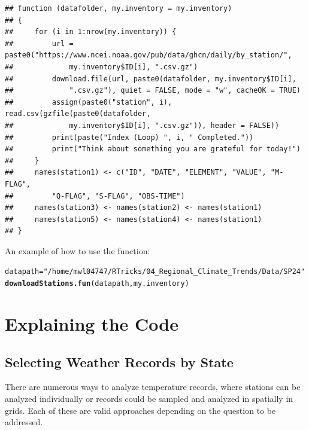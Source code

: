 \documentclass{article}\usepackage[]{graphicx}\usepackage[]{xcolor}
\makeatletter
\newcommand{\hlstr}[1]{\textcolor[rgb]{0.192,0.494,0.8}{#1}}%
\newcommand{\hlstd}[1]{\textcolor[rgb]{0.345,0.345,0.345}{#1}}%
\newcommand{\hlkwb}[1]{\textcolor[rgb]{0.69,0.353,0.396}{#1}}%
\newcommand{\hlkwd}[1]{\textcolor[rgb]{0.737,0.353,0.396}{\textbf{#1}}}%
\newenvironment{kframe}{%
 \def\at@end@of@kframe{}%
 \ifinner\ifhmode%
  \def\at@end@of@kframe{\end{minipage}}%
  \begin{minipage}{\columnwidth}%
 \fi\fi%
 \def\FrameCommand##1{\hskip\@totalleftmargin \hskip-\fboxsep
 \colorbox{shadecolor}{##1}\hskip-\fboxsep
     \hskip-\linewidth \hskip-\@totalleftmargin \hskip\columnwidth}%
 \MakeFramed {\advance\hsize-\width
   \@totalleftmargin\z@ \linewidth\hsize
   \@setminipage}}%
 {\par\unskip\endMakeFramed%
 \at@end@of@kframe}
\newenvironment{knitrout}{}{} %
\makeatother
\begin{document}
\begin{description}
\begin{knitrout}
\color{fgcolor}\begin{kframe}
\begin{verbatim}
## function (datafolder, my.inventory = my.inventory) 
## {
##     for (i in 1:nrow(my.inventory)) {
##         url = paste0("https://www.ncei.noaa.gov/pub/data/ghcn/daily/by_station/", 
##             my.inventory$ID[i], ".csv.gz")
##         download.file(url, paste0(datafolder, my.inventory$ID[i], 
##             ".csv.gz"), quiet = FALSE, mode = "w", cacheOK = TRUE)
##         assign(paste0("station", i), read.csv(gzfile(paste0(datafolder, 
##             my.inventory$ID[i], ".csv.gz")), header = FALSE))
##         print(paste("Index (Loop) ", i, " Completed."))
##         print("Think about something you are grateful for today!")
##     }
##     names(station1) <- c("ID", "DATE", "ELEMENT", "VALUE", "M-FLAG", 
##         "Q-FLAG", "S-FLAG", "OBS-TIME")
##     names(station3) <- names(station2) <- names(station1)
##     names(station5) <- names(station4) <- names(station1)
## }
\end{verbatim}
\end{kframe}
\end{knitrout}


An example of how to use the function: 

\begin{knitrout}
\color{fgcolor}\begin{kframe}
\begin{alltt}
\hlstd{datapath} \hlkwb{=} \hlstr{"/home/mwl04747/RTricks/04_Regional_Climate_Trends/Data/SP24"}
\hlkwd{downloadStations.fun}\hlstd{(datapath, my.inventory)}
\end{alltt}
\end{kframe}
\end{knitrout}


\end{description}


\section{Explaining the Code}

\subsection{Selecting Weather Records by State}

There are numerous ways to analyze temperature records, where stations can be analyzed individually or records could be sampled and analyzed in spatially in grids. Each of these are valid approaches depending on the question to be addressed. 
\end{document}
